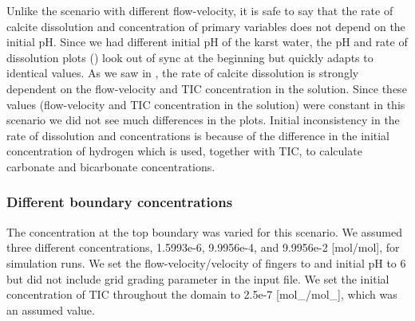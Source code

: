 Unlike the scenario with different flow-velocity, it is safe to say that the rate of calcite dissolution and concentration of primary variables 
does not depend on the initial pH. 
Since we had different initial pH of the karst water, the pH and rate of dissolution plots () look out of sync at the beginning but quickly adapts to identical values. 
As we saw in , the rate of calcite dissolution is strongly dependent on the flow-velocity and TIC concentration in the solution. 
Since these values (flow-velocity and TIC concentration in the solution) were constant in this scenario we did not see much differences in the plots. Initial 
inconsistency in the rate of dissolution and concentrations is because of the difference in the initial concentration of hydrogen which is used, together with TIC, 
to calculate carbonate and bicarbonate concentrations. 


\subsubsection*{Different boundary  concentrations} \label{ssec:diffInitialBC}
The  concentration at the top boundary was varied for this scenario. We assumed three different  concentrations, 
1.5993e-6, 9.9956e-4, and 9.9956e-2 [mol/mol], for simulation runs. We set the flow-velocity/velocity of  fingers to  
and initial pH to 6 but did not include grid grading parameter in the input file. We set the initial concentration of 
TIC throughout the domain to 2.5e-7 [mol\_/mol\_], which was an assumed value. \\

